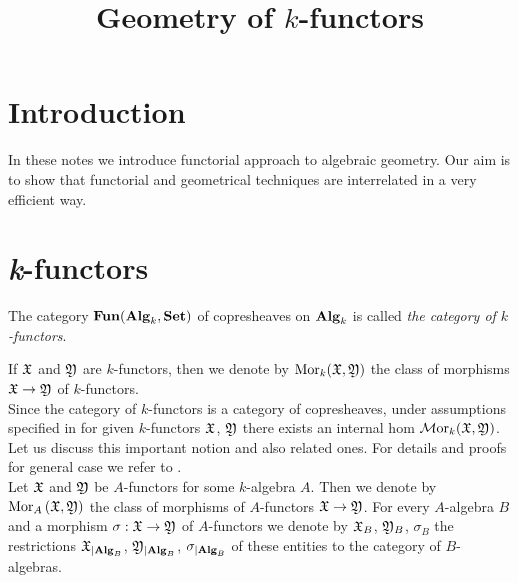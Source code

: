


\title{Geometry of $k$-functors}
\date{}
\maketitle

\section{Introduction}
\noindent
In these notes we introduce functorial approach to algebraic geometry. Our aim is to show that functorial and geometrical techniques are interrelated in a very efficient way.

\section{\textit{k}-functors}

\begin{definition}
The category $\mathbf{Fun}(\mathbf{Alg}_k,\mathbf{Set})$ of copresheaves on $\mathbf{Alg}_k$ is called \textit{the category of $k$-functors}.
\end{definition}
\noindent
If ${\mathfrak X}$ and ${\mathfrak Y}$ are $k$-functors, then we denote by $\mathrm{Mor}_k({\mathfrak X},{\mathfrak Y})$ the class of morphisms ${\mathfrak X}\rightarrow {\mathfrak Y}$ of $k$-functors.\\
Since the category of $k$-functors is a category of copresheaves, under assumptions specified in {\cite[section 5]{Presheaves}} for given $k$-functors ${\mathfrak X}$, ${\mathfrak Y}$ there exists an internal hom $\mathcal{M}\mathrm{or}_k({\mathfrak X},{\mathfrak Y})$. Let us discuss this important notion and also related ones. For details and proofs for general case we refer to {\cite[section 5]{Presheaves}}.\\
Let ${\mathfrak X}$ and ${\mathfrak Y}$ be $A$-functors for some $k$-algebra $A$. Then we denote by $\mathrm{Mor}_A\left({\mathfrak X},{\mathfrak Y}\right)$ the class of morphisms of $A$-functors ${\mathfrak X}\rightarrow {\mathfrak Y}$. For every $A$-algebra $B$ and a morphism $\sigma:{\mathfrak X}\rightarrow {\mathfrak Y}$ of $A$-functors we denote by ${\mathfrak X}_{B}$, ${\mathfrak Y}_{B}$, $\sigma_{B}$ the restrictions ${\mathfrak X}_{\mid \mathbf{Alg}_B}$, ${\mathfrak Y}_{\mid \mathbf{Alg}_B}$, $\sigma_{\mid \mathbf{Alg}_B}$ of these entities to the category of $B$-algebras. 

